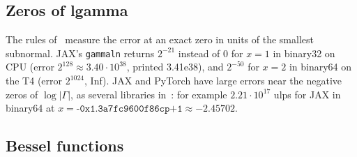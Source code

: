 \documentclass[11pt,a4paper]{article}
\begin{document}
\subsection{Zeros of lgamma}
The rules of~\cite{GIMOZ2026} measure the error at an exact zero in units of the smallest subnormal. JAX's \texttt{gammaln} returns $2^{-21}$ instead of 0 for $x=1$ in binary32 on CPU (error $2^{128}\approx 3.40\cdot10^{38}$, printed 3.41e38), and $2^{-50}$ for $x=2$ in binary64 on the T4 (error $2^{1024}$, Inf). JAX and PyTorch have large errors near the negative zeros of $\log|\Gamma|$, as several libraries in~\cite{GIMOZ2026}: for example $2.21\cdot10^{17}$ ulps for JAX in binary64 at $x=\texttt{-0x1.3a7fc9600f86cp+1}\approx -2.45702$.

\subsection{Bessel functions}
\end{document}
